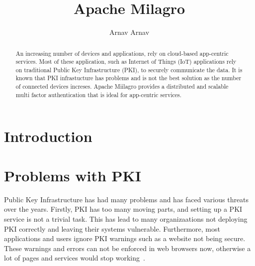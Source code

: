 
\title{Apache Milagro}


\author{Arnav Arnav}

\renewcommand{\shortauthors}{Arnav}


\begin{abstract}
An increasing number of devices and applications, rely on cloud-based
app-centric services. Most of these application, such as Internet of
Things (IoT) applications rely on traditional Public Key
Infrastructure (PKI), to securely communicate the data. It is known
that PKI infrastucture has problems and is not the best solution as
the number of connected devices increses.  Apache Miilagro provides a
distributed and scalable multi factor authentication that is ideal for
app-centric services.
\end{abstract}


\maketitle

\section{Introduction}



\section{Problems with PKI}
Public Key Infrastructure has had many problems and has faced various
threats over the years.  Firstly, PKI has too many moving parts, and
setting up a PKI service is not a trivial task. This has lead to many
organizaations not deploying PKI correctly and leaving their systems
vulnerable. Furthermore, most applications and users ignore PKI
warnings such as a website not being secure. These warnings and errors
can not be enforced in web browsers now, otherwise a lot of pages and
services would stop working~\cite{cso-pki-problems}.

